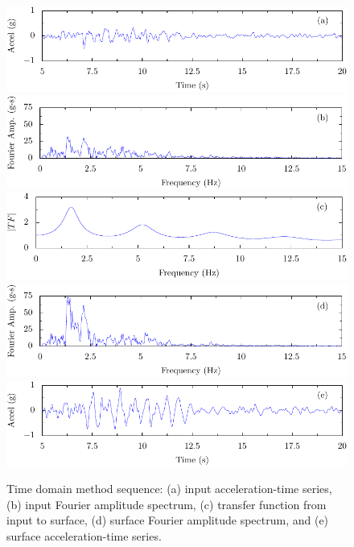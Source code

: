 \documentclass[11pt]{report}
\begin{document}
\begin{figure}[p]
  \begin{center}
	\includegraphics[width=0.95\linewidth]{figures/siteResponse/td-rock-accel-ts.pdf}
	\includegraphics[width=0.95\linewidth]{figures/siteResponse/td-rock-fas.pdf}
	\includegraphics[width=0.95\linewidth]{figures/siteResponse/td-rock-surface-tf.pdf}
	\includegraphics[width=0.95\linewidth]{figures/siteResponse/td-surface-fas.pdf}
	\includegraphics[width=0.95\linewidth]{figures/siteResponse/td-surface-accel-ts.pdf}
  \end{center}
  \caption[Time domain method sequence]{Time domain method sequence: (a) input acceleration-time series, (b) input
  Fourier amplitude spectrum, (c) transfer function from input to surface, (d) surface Fourier
  amplitude spectrum, and (e) surface acceleration-time series.}
  \label{fig:siteResponse:timeDomainSequence}
\end{figure}
\end{document}
